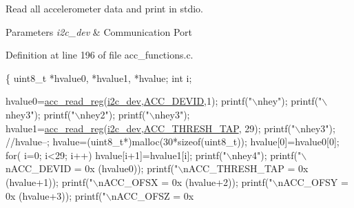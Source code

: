 Read all accelerometer data and print in stdio. 


\begin{DoxyParams}{Parameters}
{\em i2c\-\_\-dev} & Communication Port \\
\hline
\end{DoxyParams}


Definition at line 196 of file acc\-\_\-functions.\-c.


\begin{DoxyCode}
\{
  uint8\_t *hvalue0, *hvalue1, *hvalue;
  \textcolor{keywordtype}{int} i;
  
  hvalue0=\hyperlink{group__acc_ga2a91c44eebbe44f4d3b8c508633512f9}{acc\_read\_reg}(\hyperlink{CommunicationV0_2communication_8c_a7751bd45ac1064efb35adf1f19c25db8}{i2c\_dev},\hyperlink{communication_2imu__regs_8h_a007fa8d8ef9d89127ae5da32a2f42283}{ACC\_DEVID},1);
  printf(\textcolor{stringliteral}{"\(\backslash\)nhey"});
  printf(\textcolor{stringliteral}{"\(\backslash\)nhey3"});
  printf(\textcolor{stringliteral}{"\(\backslash\)nhey2"});
  printf(\textcolor{stringliteral}{"\(\backslash\)nhey3"});
  hvalue1=\hyperlink{group__acc_ga2a91c44eebbe44f4d3b8c508633512f9}{acc\_read\_reg}(\hyperlink{CommunicationV0_2communication_8c_a7751bd45ac1064efb35adf1f19c25db8}{i2c\_dev},\hyperlink{communication_2imu__regs_8h_afa5af181c4af31e22baa9bd20ff322ef}{ACC\_THRESH\_TAP},
       29);
  printf(\textcolor{stringliteral}{"\(\backslash\)nhey3"});
  \textcolor{comment}{//hvalue--;}
  hvalue=(uint8\_t*)malloc(30*\textcolor{keyword}{sizeof}(uint8\_t));
  hvalue[0]=hvalue0[0];
  \textcolor{keywordflow}{for}( i=0; i<29; i++)
    hvalue[i+1]=hvalue1[i];
  printf(\textcolor{stringliteral}{"\(\backslash\)nhey4"});
  printf(\textcolor{stringliteral}{"\(\backslash\)nACC\_DEVID = 0x%
      (hvalue0));
  printf(\textcolor{stringliteral}{"\(\backslash\)nACC\_THRESH\_TAP = 0x%
      (hvalue+1));
  printf(\textcolor{stringliteral}{"\(\backslash\)nACC\_OFSX = 0x%
      (hvalue+2));
  printf(\textcolor{stringliteral}{"\(\backslash\)nACC\_OFSY = 0x%
      (hvalue+3));
  printf(\textcolor{stringliteral}{"\(\backslash\)nACC\_OFSZ = 0x%
}}}}}
\end{DoxyCode}
